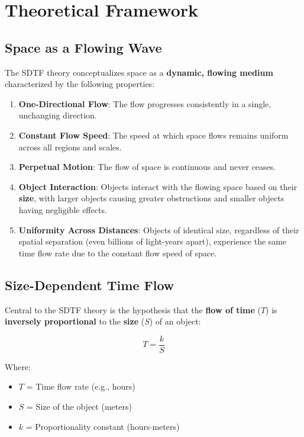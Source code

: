 \documentclass[12pt]{article}
\begin{document}
\section{Theoretical Framework}

\subsection{Space as a Flowing Wave}

The SDTF theory conceptualizes space as a \textbf{dynamic, flowing medium} characterized by the following properties:

\begin{enumerate}
    \item \textbf{One-Directional Flow}: The flow progresses consistently in a single, unchanging direction.
    \item \textbf{Constant Flow Speed}: The speed at which space flows remains uniform across all regions and scales.
    \item \textbf{Perpetual Motion}: The flow of space is continuous and never ceases.
    \item \textbf{Object Interaction}: Objects interact with the flowing space based on their \textbf{size}, with larger objects causing greater obstructions and smaller objects having negligible effects.
    \item \textbf{Uniformity Across Distances}: Objects of identical size, regardless of their spatial separation (even billions of light-years apart), experience the same time flow rate due to the constant flow speed of space.
\end{enumerate}

\subsection{Size-Dependent Time Flow}

Central to the SDTF theory is the hypothesis that the \textbf{flow of time} (\( T \)) is \textbf{inversely proportional} to the \textbf{size} (\( S \)) of an object:

\begin{equation}
    T = \frac{k}{S}
    \label{eq:time_flow}
\end{equation}

Where:
\begin{itemize}
    \item \( T \) = Time flow rate (e.g., hours)
    \item \( S \) = Size of the object (meters)
    \item \( k \) = Proportionality constant (hours$\cdot$meters)
\end{itemize}
\end{document}
